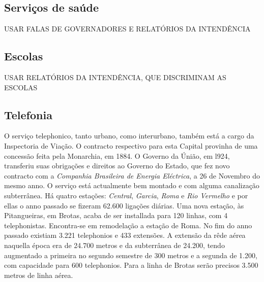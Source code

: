 \subsection{Serviços de saúde}\label{subsec:3.1.6}

USAR FALAS DE GOVERNADORES E RELATÓRIOS DA INTENDÊNCIA

\subsection{Escolas}\label{subsec:3.1.7}

USAR RELATÓRIOS DA INTENDÊNCIA, QUE DISCRIMINAM AS ESCOLAS

\subsection{Telefonia}\label{subsec:3.1.8}

\begin{citacao}
O serviço telephonico, tanto urbano, como interurbano, também está a cargo da Inspectoria de Viação.
O contracto respectivo para esta Capital provinha de uma concessão feita pela Monarchia, em 1884.
O Governo da Únião, em l924, transferiu suas obrigações e direitos ao Governo do Estado, que fez novo contracto com a \textit{Companhia Brasileira de Energia Eléctrica}, a 26 de Novembro do mesmo anno.
O serviço está actualmente bem montado e com alguma canalização subterrânea.
Há quatro estações: \textit{Central}, \textit{Garcia}, \textit{Roma} e \textit{Rio Vermelho} e por ellas o anno passado se fizeram 62.600 ligações diárias.
Uma nova estação, às Pitangueiras, em Brotas, acaba de ser installada para 120 linhas, com 4 telephonistas.
Encontra-se em remodelação a estação de Roma.
No fim do anno passado existiam 3.221 telephonios e 433 extensões.
A extensão da rêde aérea naquella época era de 24.700 metros e da subterrânea de 24.200, tendo augmentado a primeira no segundo semestre de 300 metros e a segunda
de 1.200, com capacidade para 600 telephonios.
Para a linha de Brotas serão precisos 3.500 metros de linha aérea. \cite[pp.~266-267]{bahia_rpe_1926}
\end{citacao}